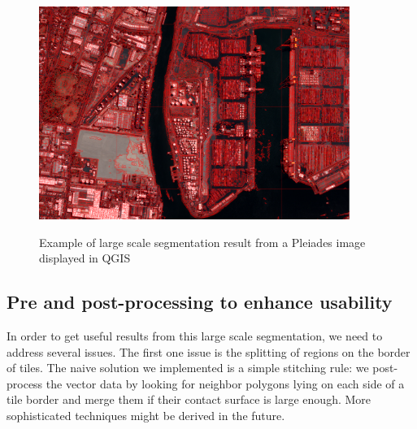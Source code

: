 \documentclass{josis}
\begin{document}
\begin{figure}[!htb]
\centering
\includegraphics[width=0.9\textwidth]{Pictures/ogrs_nostitch.png}\label{fig:nostitch}
\caption{Example of large scale segmentation result from a Pleiades
  image displayed in QGIS}
\end{figure}


\subsection{Pre and post-processing to enhance usability}

In order to get useful results from this large scale segmentation, we
need to address several issues. The first one issue is the splitting
of regions on the border of tiles. The naive solution we
implemented is a simple stitching rule: we post-process the vector
data by looking for neighbor polygons lying on each side of a tile
border and merge them if their contact surface is large enough. More
sophisticated techniques might be derived in the future.
\end{document}
